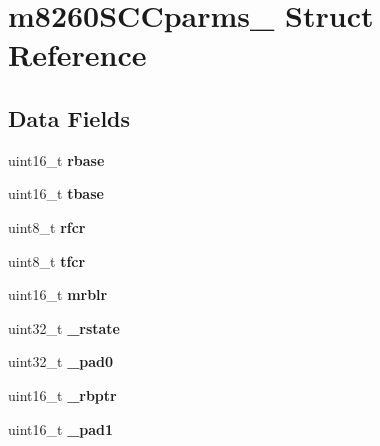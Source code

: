 \hypertarget{structm8260SCCparms__}{}\section{m8260\+S\+C\+Cparms\+\_\+ Struct Reference}
\label{structm8260SCCparms__}
\subsection*{Data Fields}
\begin{DoxyCompactItemize}
\item 
\mbox{\label{structm8260SCCparms___a9cfd462e5760f68d9d30ea84bb9857b8}} 
uint16\+\_\+t {\bfseries rbase}
\item 
\mbox{\label{structm8260SCCparms___ac0c0648eeb2d4bd82ce5df4dcfb143ae}} 
uint16\+\_\+t {\bfseries tbase}
\item 
\mbox{\label{structm8260SCCparms___acbc91c4b53b0c002b4aeb7aa9a511bb4}} 
uint8\+\_\+t {\bfseries rfcr}
\item 
\mbox{\label{structm8260SCCparms___ab58284152fbe5657f38867237fc4a695}} 
uint8\+\_\+t {\bfseries tfcr}
\item 
\mbox{\label{structm8260SCCparms___a43b13aae10e46462a752da8ca24ad9f8}} 
uint16\+\_\+t {\bfseries mrblr}
\item 
\mbox{\label{structm8260SCCparms___a3d4886cc70269c95dc7bc0f74bf8b770}} 
uint32\+\_\+t {\bfseries \+\_\+rstate}
\item 
\mbox{\label{structm8260SCCparms___a14f71d8f4b508da81caf12acea99a4a1}} 
uint32\+\_\+t {\bfseries \+\_\+pad0}
\item 
\mbox{\label{structm8260SCCparms___ae04da7f667f2db5b8a76ad0ebec8c77d}} 
uint16\+\_\+t {\bfseries \+\_\+rbptr}
\item 
\mbox{\label{structm8260SCCparms___a5f59933d6c9d8c48473c415d365168b5}} 
uint16\+\_\+t {\bfseries \+\_\+pad1}
\item 

\end{DoxyCompactItemize}
